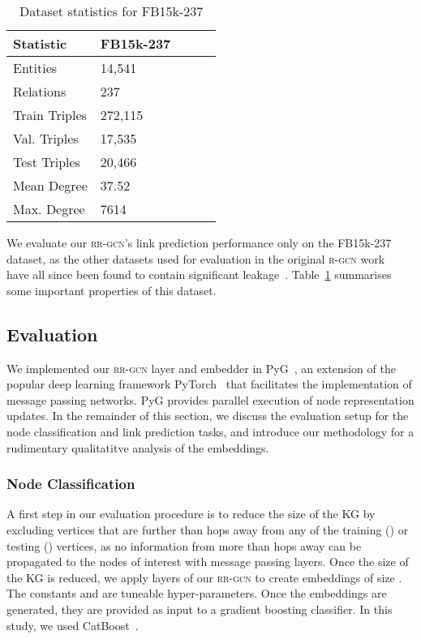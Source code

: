 \documentclass{llncs}
\begin{document}
\begin{table}[h!]
\begin{center}
 
\begin{tabular}{lllll}\toprule
     \textbf{Statistic}      & \textbf{FB15k-237}\\\midrule
Entities  &  14,541 \\
Relations  & 237 \\
Train Triples  & 272,115  \\
Val. Triples  & 17,535  \\
Test Triples  & 20,466 \\
Mean Degree &  37.52 \\
Max. Degree & 7614 \\ \bottomrule
\end{tabular}
\end{center}
\caption{Dataset statistics for FB15k-237\label{table:statistics3}}
\end{table}

We evaluate our \textsc{rr-gcn}'s link prediction performance only on the FB15k-237 dataset, as the other datasets used for evaluation in the original \textsc{r-gcn} work~\cite{schlichtkrull2018modeling} have all since been found to contain significant leakage~\cite{dettmers2018convolutional}. Table~\ref{table:statistics3} summarises some important properties of this dataset.

\subsection{Evaluation} \label{sec:setup}
We implemented our \textsc{rr-gcn} layer and embedder in PyG~\cite{NEURIPS2019_9015}, an extension of the popular deep learning framework PyTorch~\cite{Fey/Lenssen/2019} that facilitates the implementation of message passing networks. PyG provides parallel execution of node representation updates. In the remainder of this section, we discuss the evaluation setup for the node classification and link prediction tasks, and introduce our methodology for a rudimentary qualitatitve analysis of the embeddings.

\subsubsection{Node Classification}
A first step in our evaluation procedure is to reduce the size of the KG by excluding vertices that are further than  hops away from any of the training () or testing () vertices, as no information from more than  hops away can be propagated to the nodes of interest with  message passing layers. Once the size of the KG is reduced, we apply  layers of our \textsc{rr-gcn} to create embeddings of size . The constants  and  are tuneable hyper-parameters. Once the embeddings are generated, they are provided as input to a gradient boosting classifier. In this study, we used CatBoost~\cite{dorogush2018catboost}.
\end{document}
